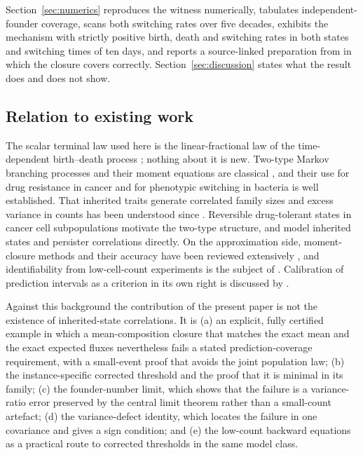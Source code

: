 \documentclass[11pt,a4paper]{article}
\theoremstyle{plain}
\theoremstyle{definition}
\theoremstyle{remark}
\begin{document}
Section~\ref{sec:numerics} reproduces the witness numerically, tabulates independent-founder coverage, scans both switching rates over five decades, exhibits the mechanism with strictly positive birth, death and switching rates in both states and switching times of ten days, and reports a source-linked preparation from \citet{browning2025} in which the closure covers correctly. Section~\ref{sec:discussion} states what the result does and does not show.

\subsection{Relation to existing work}
The scalar terminal law used here is the linear-fractional law of the time-dependent birth--death process \citep{kendall1948,bailey1964}; nothing about it is new. Two-type Markov branching processes and their moment equations are classical \citep{harris1963,athreyaney1972,haccou2005}, and their use for drug resistance in cancer \citep{iwasa2006,bozic2013,durrett2015} and for phenotypic switching in bacteria \citep{balaban2004,kussell2005} is well established. That inherited traits generate correlated family sizes and excess variance in counts has been understood since \citet{luria1943}. Reversible drug-tolerant states in cancer cell subpopulations \citep{sharma2010,shaffer2017} motivate the two-type structure, and \citet{iyer2025} model inherited states and persister correlations directly. On the approximation side, moment-closure methods and their accuracy have been reviewed extensively \citep{singh2011,grima2012,schnoerr2017}, and identifiability from low-cell-count experiments is the subject of \citet{browning2020,browning2025}. Calibration of prediction intervals as a criterion in its own right is discussed by \citet{gneiting2007}.

Against this background the contribution of the present paper is not the existence of inherited-state correlations. It is (a) an explicit, fully certified example in which a mean-composition closure that matches the exact mean and the exact expected fluxes nevertheless fails a stated prediction-coverage requirement, with a small-event proof that avoids the joint population law; (b) the instance-specific corrected threshold and the proof that it is minimal in its family; (c) the founder-number limit, which shows that the failure is a variance-ratio error preserved by the central limit theorem rather than a small-count artefact; (d) the variance-defect identity, which locates the failure in one covariance and gives a sign condition; and (e) the low-count backward equations as a practical route to corrected thresholds in the same model class.
\end{document}

